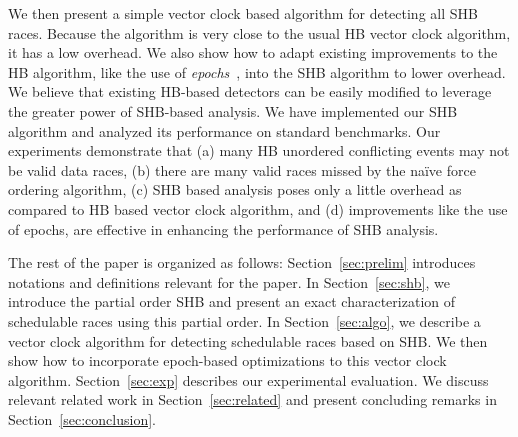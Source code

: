 We then present a simple vector clock based algorithm for detecting
all SHB races. Because the algorithm is very close to the usual HB
vector clock algorithm, it has a low overhead. We also show how to
adapt existing improvements to the HB algorithm, like the use
of \emph{epochs}~\cite{fasttrack}, into the SHB algorithm to lower
overhead. We believe that existing HB-based detectors can be easily
modified to leverage the greater power of SHB-based analysis. 
%
We have implemented our SHB algorithm and analyzed its performance on
standard benchmarks. Our experiments demonstrate that (a) many HB
unordered conflicting events may not be valid data races, (b) there
are many valid races missed by the na\"{i}ve force ordering algorithm,
(c) SHB based analysis poses only a little overhead as compared to HB
based vector clock algorithm, and (d) improvements like the use of
epochs, are effective in enhancing the performance of SHB analysis.


The rest of the paper is organized as follows:
	Section~\ref{sec:prelim} introduces notations and definitions relevant for the paper.
	In Section~\ref{sec:shb}, we introduce the partial order SHB and present an exact 
	characterization of schedulable races using this partial order.
	In Section~\ref{sec:algo}, we describe a vector clock algorithm for detecting
	schedulable races based on SHB. We then show how to incorporate epoch-based
	optimizations to this vector clock algorithm.
	Section~\ref{sec:exp} describes our experimental evaluation.
	We discuss relevant related work in Section~\ref{sec:related} and present
	concluding remarks in Section~\ref{sec:conclusion}.



